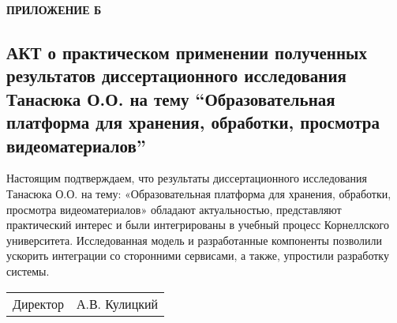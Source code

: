 \begin{flushright}
  \fontsize{19}{0}\textbf{ПРИЛОЖЕНИЕ Б}
\end{flushright}


\subsection*{АКТ о практическом применении полученных результатов диссертационного
исследования Танасюка О.О. на тему “Образовательная платформа для хранения,
обработки, просмотра видеоматериалов” }

\bigskip\bigskip\bigskip

Настоящим подтверждаем, что результаты диссертационного исследования Танасюка О.О.
на тему: «Образовательная платформа для хранения,
обработки, просмотра видеоматериалов» обладают актуальностью,
представляют практический интерес и были интегрированы в учебный процесс Корнеллского университета.
Исследованная модель и разработанные компоненты
позволили ускорить интеграции со сторонними сервисами, а также, упростили разработку системы.

\bigskip\bigskip\bigskip\bigskip

\begin{tabular}{ l l }

  Директор & \hspace*{8cm} А.В. Кулицкий\\
\end{tabular}